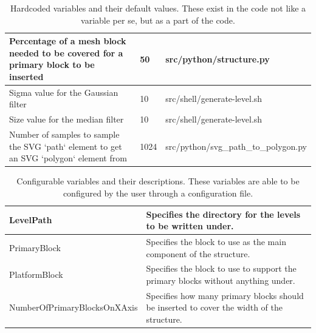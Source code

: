 \documentclass{dalthesis}
\begin{document}
\begin{table}
	\centering
  \begin{tabular}{ | p{7cm} | p{2cm} | p{7cm} | }
		\hline
    Percentage of a mesh block needed to be covered for a primary block to be inserted & 50 & src/python/structure.py \\
		\hline
    Sigma value for the Gaussian filter & 10 & src/shell/generate-level.sh \\
		\hline
    Size value for the median filter & 10 & src/shell/generate-level.sh \\
		\hline
    Number of samples to sample the SVG `path` element to get an SVG `polygon` element from & 1024 & src/python/svg{\_}path{\_}to{\_}polygon.py \\
		\hline
  \end{tabular}
  \caption{Hardcoded variables and their default values. These exist in the code not like a variable per se, but as a part of the code.}
\end{table}

\begin{table}
	\centering
  \begin{tabular}{ | p{8cm} | p{8cm} | }
		\hline
    LevelPath & Specifies the directory for the levels to be written under. \\
		\hline
    PrimaryBlock & Specifies the block to use as the main component of the structure. \\
		\hline
    PlatformBlock & Specifies the block to use to support the primary blocks without anything under. \\
		\hline
    NumberOfPrimaryBlocksOnXAxis & Specifies how many primary blocks should be inserted to cover the width of the structure. \\
		\hline
  \end{tabular}
  \caption{Configurable variables and their descriptions. These variables are able to be configured by the user through a configuration file.}
\end{table}



\end{document}
